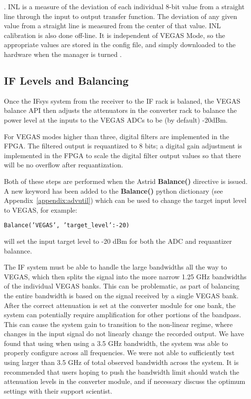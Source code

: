 . INL is a measure of the deviation of
each individual 8-bit value from a straight line through the input to
output transfer function. The deviation of any given value from a straight
line is measured from the center of that value. INL calibration is also
done off-line. It is independent of VEGAS Mode, so the appropriate values
are stored in the config file, and simply downloaded to the hardware when
the manager is turned .


\subsection{IF Levels and Balancing}\label{sec:vegas_balancing}

Once the \gls{IFsys} system from the receiver to the IF rack is balaned, 
the VEGAS balance \gls{API} then adjusts the attenuators in the converter rack
to balance the power level at the inputs to the VEGAS \glspl{ADC} to be
(by default) -20dBm.

For VEGAS modes higher than three, digital filters are implemented in the
\gls{FPGA}. The filtered output is requantized to 8 bits; a digital gain
adjustment is implemented in the \gls{FPGA} to scale the digital filter
output values so that there will be no overflow after requantization. 

Both of these steps are performed when the \gls{Astrid}
{\bfseries{\textcolor{pythonKeywords}{Balance}}()} directive is
issued. A new keyword has been added to the
{\bfseries{\textcolor{pythonKeywords}{Balance}}()} python dictionary 
(see Appendix~\ref{appendix:advutil}) which can be used to change the
target input level to VEGAS, for example:

{\tt Balance('VEGAS', {'target\_level':-20})}

will set the input target level to -20 dBm for both the \gls{ADC} and requantizer
balannce.

The \gls{IF} system must be able to handle the large bandwidths all
the way to VEGAS, which then splits the signal into the more narrow 1.25 GHz
bandwidths of the individual VEGAS banks. This can be problematic, as part
of balancing the  entire bandwidth is based on the signal received by a single
VEGAS bank. After the correct attenuation is set at the converter module for
one bank, the system can potentially require amplification for other portions
of the bandpass. This can cause the system gain to transition to the non-linear
regime, where changes in the input signal do not linearly change the recorded output. 
We have found that using when using a 3.5 GHz bandwidth, the system was able 
to properly configure across all frequencies. We were not able to sufficiently 
test using larger than 3.5 GHz of total observed bandwidth across the system. 
It is recommended that users hoping to push the bandwidth limit should watch 
the attenuation levels in the converter module, and if necessary discuss the
optimum settings with their support scientist.


